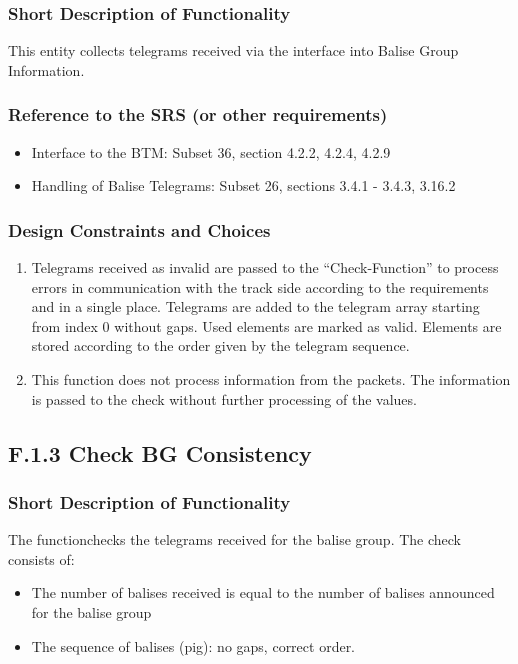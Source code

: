 \documentclass{template/openetcs_report}
\begin{document}
\subsubsection{Short Description of Functionality}
This entity collects telegrams received via the interface into Balise Group Information.
	
\subsubsection{Reference to the SRS (or other requirements)}
\begin{itemize}
\item Interface to the BTM: Subset 36, section  4.2.2, 4.2.4, 4.2.9\\
\item Handling of Balise Telegrams: Subset 26, sections 3.4.1 - 3.4.3, 3.16.2 \\
\end{itemize}

\subsubsection{Design Constraints and Choices}
\begin{enumerate}
\item Telegrams received as invalid are passed to the ``Check-Function'' to process errors in communication with the track side according to the requirements and in a single place.
Telegrams are added to the telegram array starting from index 0 without gaps. Used elements are marked as valid. Elements are stored according to the order given by the telegram sequence.
\item This function does not process information from the packets. The information is passed to the check without further processing of the values. 
\end{enumerate}



\subsection{F.1.3 Check BG Consistency}

\subsubsection{Short Description of Functionality}
The functionchecks the telegrams received for the balise group. The check consists of:\\
\begin{itemize}
\item The number of balises received is equal to the number of balises announced for the balise group
\item The sequence of balises (pig): no gaps, correct order.
\end{itemize}
\end{document}
